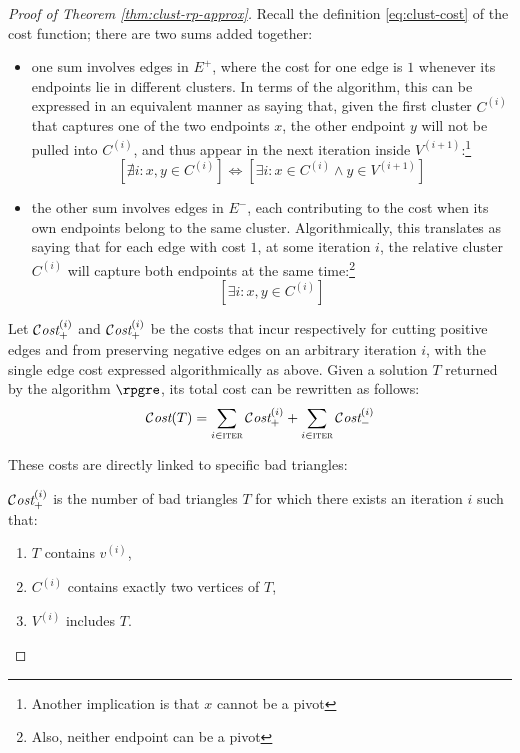 \begin{proof}[Proof of Theorem \ref{thm:clust-rp-approx}]
    Recall the definition \ref{eq:clust-cost} of the cost function; there are two sums added together:
    
    \begin{itemize}
        \item one sum involves edges in $E^+$, where the cost for one edge is $1$ whenever its endpoints lie in different clusters. In terms of the algorithm, this can be expressed in an equivalent manner as saying that, given the first cluster $C^{(i)}$ that captures one of the two endpoints $x$, the other endpoint $y$ will not be pulled into $C^{(i)}$, and thus appear in the next iteration inside $V^{(i + 1)}$:\footnote{Another implication is that $x$ cannot be a pivot}
        \[
            \left[ \nexists i : x, y \in C^{(i)} \right] \iff \left[ \exists i : x \in C^{(i)} \wedge y \in V^{(i + 1)} \right]
        \]
        \item the other sum involves edges in $E^-$, each contributing to the cost when its own endpoints belong to the same cluster. Algorithmically, this translates as saying that for each edge with cost $1$, at some iteration $i$, the relative cluster $C^{(i)}$ will capture both endpoints at the same time:\footnote{Also, neither endpoint can be a pivot}
        \[
            \left[ \exists i : x, y \in C^{(i)} \right]
        \]
    \end{itemize}

    Let $\mathcal{C}\textit{ost}_+^{(i)}$ and $\mathcal{C}\textit{ost}_+^{(i)}$ be the costs that incur respectively for cutting positive edges and from preserving negative edges on an arbitrary iteration $i$, with the single edge cost expressed algorithmically as above. Given a solution $T$ returned by the algorithm $\rpgre$, its total cost can be rewritten as follows:
    \[
        \mathcal{C}\textit{ost}(T) = \sum_{i \in \textsc{iter}} \mathcal{C}\textit{ost}_+^{(i)} + \sum_{i \in \textsc{iter}} \mathcal{C}\textit{ost}_-^{(i)}
    \]

    These costs are directly linked to specific bad triangles:
    
    \begin{claim}\label{cl:clust-1}
        $\mathcal{C}\textit{ost}_+^{(i)}$ is the number of bad triangles $T$ for which there exists an iteration $i$ such that:
        \begin{enumerate}
            \item $T$ contains $v^{(i)}$,
            \item $C^{(i)}$ contains exactly two vertices of $T$,
            \item $V^{(i)}$ includes $T$.
        \end{enumerate}
    \end{claim}


\end{proof}
